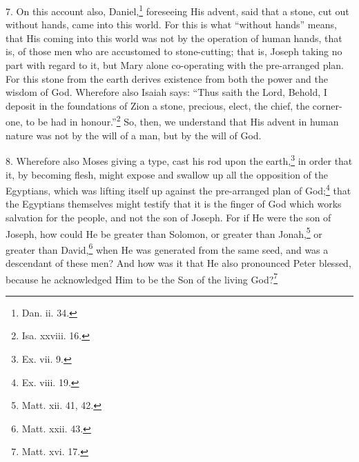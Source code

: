 7. On this account also, Daniel,\footnote{Dan. ii. 34.} foreseeing His advent, said that a stone, cut out without hands, came into this world. For this is what “without hands” means, that His coming into this world was not by the operation of human hands, that is, of those men who are accustomed to stone-cutting; that is, Joseph taking no part with regard to it, but Mary alone co-operating with the pre-arranged plan. For this stone from the earth derives existence from both the power and the wisdom of God. Wherefore also Isaiah says: “Thus saith the Lord, Behold, I deposit in the foundations of Zion a stone, precious, elect, the chief, the corner-one, to be had in honour.”\footnote{Isa. xxviii. 16.} So, then, we understand that His advent in human nature was not by the will of a man, but by the will of God.

8. Wherefore also Moses giving a type, cast his rod upon the earth,\footnote{Ex. vii. 9.} in order that it, by becoming flesh, might expose and swallow up all the opposition of the Egyptians, which was lifting itself up against the pre-arranged plan of God;\footnote{Ex. viii. 19.} that the Egyptians themselves might testify that it is the finger of God which works salvation for the people, and not the son of Joseph. For if He were the son of Joseph, how could He be greater than Solomon, or greater than Jonah,\footnote{Matt. xii. 41, 42.} or greater than David,\footnote{Matt. xxii. 43.} when He was generated from the same seed, and was a descendant of these men? And how was it that He also pronounced Peter blessed, because he acknowledged Him to be the Son of the living God?\footnote{Matt. xvi. 17.}

